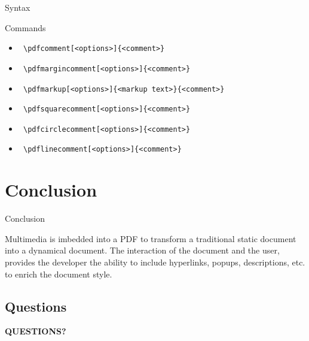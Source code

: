 \documentclass[article]{beamer}
\begin{document}
\begin{frame}[fragile]{Syntax}

\begin{block}{Commands}

\begin{itemize}
\item \verb! \pdfcomment[<options>]{<comment>}!
\item \verb! \pdfmargincomment[<options>]{<comment>}!
\item \verb! \pdfmarkup[<options>]{<markup text>}{<comment>}!
\item \verb! \pdfsquarecomment[<options>]{<comment>}!
\item \verb! \pdfcirclecomment[<options>]{<comment>}!
\item \verb! \pdflinecomment[<options>]{<comment>}!
\end{itemize}

\end{block}

\end{frame}

\section{Conclusion}

\begin{frame}[fragile]{}

\begin{block}{Conclusion}

Multimedia is imbedded into a PDF to transform a traditional static document into a dynamical document. The interaction of the document and the user, provides the developer the ability to include hyperlinks, popups, descriptions, etc. to enrich the document style.

\end{block}

\end{frame}

\subsection{Questions}

\begin{frame}[fragile]{}

\centering
{\Huge{\bfseries QUESTIONS?}}

\end{frame}
\end{document}
